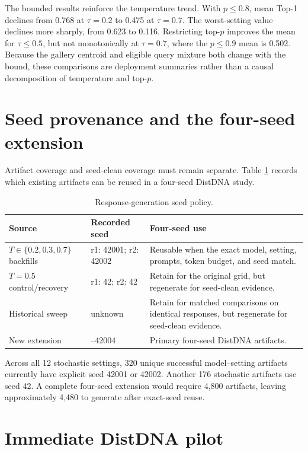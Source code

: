 \documentclass[11pt,a4paper]{article}
\begin{document}
The bounded results reinforce the temperature trend. With $p\leq0.8$, mean
Top-1 declines from 0.768 at $\tau=0.2$ to 0.475 at $\tau=0.7$. The
worst-setting value declines more sharply, from 0.623 to 0.116. Restricting
top-$p$ improves the mean for $\tau\leq0.5$, but not monotonically at
$\tau=0.7$, where the $p\leq0.9$ mean is 0.502. Because the gallery centroid
and eligible query mixture both change with the bound, these comparisons are
deployment summaries rather than a causal decomposition of temperature and
top-$p$.

\section{Seed provenance and the four-seed extension}

Artifact coverage and seed-clean coverage must remain separate. Table
\ref{tab:seed-policy} records which existing artifacts can be reused in a
four-seed DistDNA study.

\begin{table}[htbp]
\centering
\caption{Response-generation seed policy.}
\label{tab:seed-policy}
\begin{tabularx}{\textwidth}{>{\raggedright\arraybackslash}p{}>{\raggedright\arraybackslash}p{}>{\raggedright\arraybackslash}X}
\toprule
Source & Recorded seed & Four-seed use \\
\midrule
$T\in\{0.2,0.3,0.7\}$ backfills & r1: 42001; r2: 42002 & Reusable when the exact model, setting, prompts, token budget, and seed match. \\
$T=0.5$ control/recovery & r1: 42; r2: 42 & Retain for the original grid, but regenerate for seed-clean evidence. \\
Historical sweep & unknown & Retain for matched comparisons on identical responses, but regenerate for seed-clean evidence. \\
New extension & 42001--42004 & Primary four-seed DistDNA artifacts. \\
\bottomrule
\end{tabularx}
\end{table}

Across all 12 stochastic settings, 320 unique successful model--setting
artifacts currently have explicit seed 42001 or 42002. Another 176 stochastic
artifacts use seed 42. A complete four-seed extension would require 4,800
artifacts, leaving approximately 4,480 to generate after exact-seed reuse.

\section{Immediate DistDNA pilot}
\end{document}
